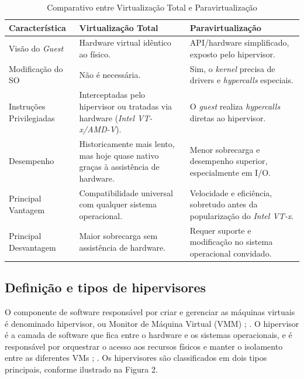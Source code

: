 \begin{table}[H]
    \centering

    \caption{Comparativo entre Virtualização Total e Paravirtualização}
    \label{tab:comparativo_virtualizacao}

    \begin{tabularx}{\textwidth}{ l >{\raggedright\arraybackslash}X >{\raggedright\arraybackslash}X }
        \toprule
        \textbf{Característica} & \textbf{Virtualização Total} & \textbf{Paravirtualização} \\
        \midrule
        Visão do \textit{Guest} & Hardware virtual idêntico ao físico. & API/hardware simplificado, exposto pelo hipervisor. \\
        \addlinespace
        Modificação do SO & Não é necessária. & Sim, o \textit{kernel} precisa de drivers e \textit{hypercalls} especiais. \\
        \addlinespace
        Instruções Privilegiadas & Interceptadas pelo hipervisor ou tratadas via hardware (\textit{Intel VT-x/AMD-V}). & O \textit{guest} realiza \textit{hypercalls} diretas ao hipervisor. \\
        \addlinespace
        Desempenho & Historicamente mais lento, mas hoje quase nativo graças à assistência de hardware. & Menor sobrecarga e desempenho superior, especialmente em I/O. \\
        \addlinespace
        Principal Vantagem & Compatibilidade universal com qualquer sistema operacional. & Velocidade e eficiência, sobretudo antes da popularização do \textit{Intel VT-x}. \\
        \addlinespace
        Principal Desvantagem & Maior sobrecarga sem assistência de hardware. & Requer suporte e modificação no sistema operacional convidado. \\
        \bottomrule
    \end{tabularx}

\end{table}


\subsection{Definição e tipos de hipervisores}
O componente de software responsável por criar e gerenciar as máquinas virtuais é denominado hipervisor, ou Monitor de Máquina Virtual (VMM) \cite{chawla2025}; \cite{carissimi2008}. O hipervisor é a camada de software que fica entre o hardware e os sistemas operacionais, e é responsável por orquestrar o acesso aos recursos físicos e manter o isolamento entre as diferentes VMs \cite{chawla2025}; \cite{carissimi2008}. Os hipervisores são classificados em dois tipos principais, conforme ilustrado na Figura 2.

